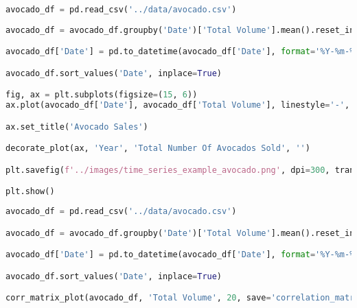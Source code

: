 \begin{center}
  \begin{lstlisting}[language=Python, 
  caption={Еженедельный объём продаж авокадо}, 
  label={lst:time_series_example_avocado}]
avocado_df = pd.read_csv('../data/avocado.csv')
  
avocado_df = avocado_df.groupby('Date')['Total Volume'].mean().reset_index()

avocado_df['Date'] = pd.to_datetime(avocado_df['Date'], format='%Y-%m-%d')

avocado_df.sort_values('Date', inplace=True)

fig, ax = plt.subplots(figsize=(15, 6))
ax.plot(avocado_df['Date'], avocado_df['Total Volume'], linestyle='-', color=RED)

ax.set_title('Avocado Sales')

decorate_plot(ax, 'Year', 'Total Number Of Avocados Sold', '')

plt.savefig(f'../images/time_series_example_avocado.png', dpi=300, transparent=True)

plt.show()
  \end{lstlisting}
\end{center}

\begin{center}
  \begin{lstlisting}[language=Python, 
  caption={Диагональная корреляционная матрица объема продаж авокадо.}, 
  label={lst:correlation_matrix_avocado}]
avocado_df = pd.read_csv('../data/avocado.csv')

avocado_df = avocado_df.groupby('Date')['Total Volume'].mean().reset_index()

avocado_df['Date'] = pd.to_datetime(avocado_df['Date'], format='%Y-%m-%d')

avocado_df.sort_values('Date', inplace=True)

corr_matrix_plot(avocado_df, 'Total Volume', 20, save='correlation_matrix_avocado')
  \end{lstlisting}
\end{center}


